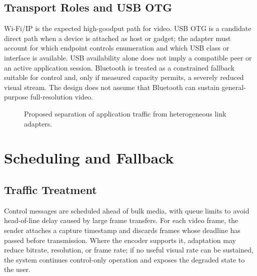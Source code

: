 \documentclass[conference]{IEEEtran}
\begin{document}
\subsection{Transport Roles and USB OTG}
Wi-Fi/IP is the expected high-goodput path for video. USB OTG is a candidate
direct path when a device is attached as host or gadget; the adapter must
account for which endpoint controls enumeration and which USB class or
interface is available. USB availability alone does not imply a compatible
peer or an active application session. Bluetooth is treated as a constrained
fallback suitable for control and, only if measured capacity permits, a
severely reduced visual stream. The design does not assume that Bluetooth
can sustain general-purpose full-resolution video.

\begin{figure}[t]
\centering
{}
\caption{Proposed separation of application traffic from heterogeneous link adapters.}
\label{fig:architecture}
\end{figure}

\section{Scheduling and Fallback}
\subsection{Traffic Treatment}
Control messages are scheduled ahead of bulk media, with queue limits to
avoid head-of-line delay caused by large frame transfers. For each video
frame, the sender attaches a capture timestamp and discards frames whose
deadline has passed before transmission. Where the encoder supports it,
adaptation may reduce bitrate, resolution, or frame rate; if no useful
visual rate can be sustained, the system continues control-only operation
and exposes the degraded state to the user.
\end{document}
